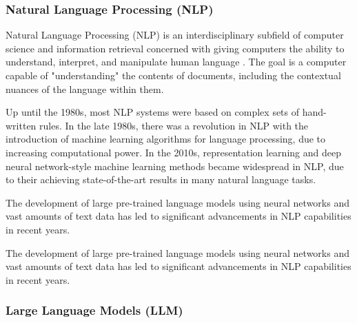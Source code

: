 \documentclass{article}
\begin{document}
\subsubsection{Natural Language Processing (NLP)}

Natural Language Processing (NLP) is an interdisciplinary subfield
of computer science and information retrieval concerned with giving
computers the ability to understand, interpret, and manipulate human
language . The goal is a computer capable of "understanding"
the contents of documents, including the contextual nuances of the
language within them.

Up until the 1980s, most NLP systems were based on complex sets of
hand-written rules. In the late 1980s, there was a revolution in NLP with
the introduction of machine learning algorithms for language processing,
due to increasing computational power. In the 2010s, representation learning
and deep neural network-style machine learning methods became widespread in
NLP, due to their achieving state-of-the-art results in many natural language
tasks.

The development of large pre-trained language models using neural networks and
vast amounts of text data has led to significant advancements in
NLP capabilities in recent years.


The development of large pre-trained language models using neural networks and vast amounts of text data has led to significant advancements in NLP capabilities in recent years.

\subsubsection{Large Language Models (LLM)}
\end{document}
